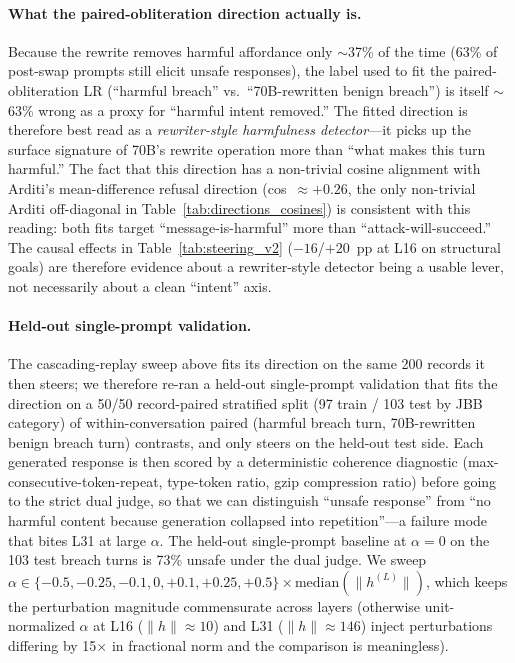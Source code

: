 \documentclass[11pt]{article}
\begin{document}
\paragraph{What the paired-obliteration direction actually is.}
Because the rewrite removes harmful affordance only $\sim$37\% of the time (63\% of post-swap prompts still elicit unsafe responses), the label used to fit the paired-obliteration LR (``harmful breach'' vs.\ ``70B-rewritten benign breach'') is itself $\sim$63\% wrong as a proxy for ``harmful intent removed.''
The fitted direction is therefore best read as a \emph{rewriter-style harmfulness detector}---it picks up the surface signature of 70B's rewrite operation more than ``what makes this turn harmful.''
The fact that this direction has a non-trivial cosine alignment with Arditi's mean-difference refusal direction (cos~$\approx +0.26$, the only non-trivial Arditi off-diagonal in Table~\ref{tab:directions_cosines}) is consistent with this reading: both fits target ``message-is-harmful'' more than ``attack-will-succeed.''
The causal effects in Table~\ref{tab:steering_v2} ($-16$/$+20$~pp at L16 on structural goals) are therefore evidence about a rewriter-style detector being a usable lever, not necessarily about a clean ``intent'' axis.

\paragraph{Held-out single-prompt validation.}
The cascading-replay sweep above fits its direction on the same 200 records it then steers; we therefore re-ran a held-out single-prompt validation that fits the direction on a 50/50 record-paired stratified split (97 train / 103 test by JBB category) of within-conversation paired (harmful breach turn, 70B-rewritten benign breach turn) contrasts, and only steers on the held-out test side.
Each generated response is then scored by a deterministic coherence diagnostic (max-consecutive-token-repeat, type-token ratio, gzip compression ratio) before going to the strict dual judge, so that we can distinguish ``unsafe response'' from ``no harmful content because generation collapsed into repetition''---a failure mode that bites L31 at large $\alpha$.
The held-out single-prompt baseline at $\alpha=0$ on the 103 test breach turns is 73\% unsafe under the dual judge.
We sweep $\alpha \in \{-0.5,-0.25,-0.1,0,+0.1,+0.25,+0.5\} \times \mathrm{median}(\|h^{(L)}\|)$, which keeps the perturbation magnitude commensurate across layers (otherwise unit-normalized $\alpha$ at L16 ($\|h\|{\approx}10$) and L31 ($\|h\|{\approx}146$) inject perturbations differing by 15$\times$ in fractional norm and the comparison is meaningless).
\end{document}
